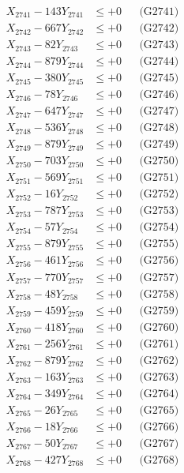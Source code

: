 \documentclass[a4paper,10pt]{article}
\begin{document}
{\begin{align}
\allowbreak
X_{2741} - 143Y_{2741} &\leq +0 && \text{(G2741)} \\
X_{2742} - 667Y_{2742} &\leq +0 && \text{(G2742)} \\
X_{2743} - 82Y_{2743} &\leq +0 && \text{(G2743)} \\
X_{2744} - 879Y_{2744} &\leq +0 && \text{(G2744)} \\
X_{2745} - 380Y_{2745} &\leq +0 && \text{(G2745)} \\
X_{2746} - 78Y_{2746} &\leq +0 && \text{(G2746)} \\
X_{2747} - 647Y_{2747} &\leq +0 && \text{(G2747)} \\
X_{2748} - 536Y_{2748} &\leq +0 && \text{(G2748)} \\
X_{2749} - 879Y_{2749} &\leq +0 && \text{(G2749)} \\
X_{2750} - 703Y_{2750} &\leq +0 && \text{(G2750)} \\
\allowbreak
X_{2751} - 569Y_{2751} &\leq +0 && \text{(G2751)} \\
X_{2752} - 16Y_{2752} &\leq +0 && \text{(G2752)} \\
X_{2753} - 787Y_{2753} &\leq +0 && \text{(G2753)} \\
X_{2754} - 57Y_{2754} &\leq +0 && \text{(G2754)} \\
X_{2755} - 879Y_{2755} &\leq +0 && \text{(G2755)} \\
X_{2756} - 461Y_{2756} &\leq +0 && \text{(G2756)} \\
X_{2757} - 770Y_{2757} &\leq +0 && \text{(G2757)} \\
X_{2758} - 48Y_{2758} &\leq +0 && \text{(G2758)} \\
X_{2759} - 459Y_{2759} &\leq +0 && \text{(G2759)} \\
X_{2760} - 418Y_{2760} &\leq +0 && \text{(G2760)} \\
\allowbreak
X_{2761} - 256Y_{2761} &\leq +0 && \text{(G2761)} \\
X_{2762} - 879Y_{2762} &\leq +0 && \text{(G2762)} \\
X_{2763} - 163Y_{2763} &\leq +0 && \text{(G2763)} \\
X_{2764} - 349Y_{2764} &\leq +0 && \text{(G2764)} \\
X_{2765} - 26Y_{2765} &\leq +0 && \text{(G2765)} \\
X_{2766} - 18Y_{2766} &\leq +0 && \text{(G2766)} \\
X_{2767} - 50Y_{2767} &\leq +0 && \text{(G2767)} \\
X_{2768} - 427Y_{2768} &\leq +0 && \text{(G2768)} \\

\end{align}}
\end{document}
